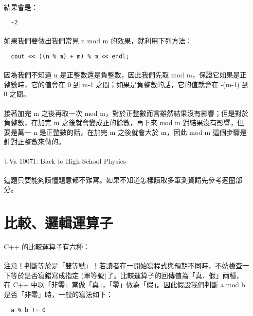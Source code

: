 \documentclass[12pt,a4paper,oneside]{report}
\begin{document}
\begin{CJK}{UTF8}{bkai}
\paragraph{}結果會是：
\begin{lstlisting}
  -2
\end{lstlisting}
\paragraph{}如果我們要做出我們常見 n mod m 的效果，就利用下列方法：
\begin{lstlisting}
  cout << ((n % m) + m) % m << endl;
\end{lstlisting}
\paragraph{}因為我們不知道 n 是正整數還是負整數，因此我們先取 mod m，保證它如果是正整數時，它的值會在 0 到 m-1 之間；如果是負整數的話，它的值就會在 -(m-1) 到 0 之間。
\paragraph{}接著加完 m 之後再取一次 mod m，對於正整數而言雖然結果沒有影響；但是對於負整數，在加完 m 之後就會變成正的餘數，再下來 mod m 對結果沒有影響，但要是萬一 n 是正整數的話，在加完 m 之後就會大於 m，因此 mod m 這個步驟是針對正整數來做的。
\label{UVa:10071}
\paragraph{}UVa 10071: Back to High School Physics
\paragraph{}這題只要能夠讀懂題意都不難寫。如果不知道怎樣讀取多筆測資請先參考迴圈部分。

\section{比較、邏輯運算子}

\paragraph{}C++ 的比較運算子有六種：
\paragraph{}注意！判斷等於是「雙等號」！若讀者在一開始寫程式與預期不同時，不妨檢查一下等於是否寫錯寫成指定 (單等號)了。比較運算子的回傳值為「真、假」兩種，在 C++ 中以「非零」當做「真」，「零」做為「假」。因此假設我們判斷 a mod b 是否「非零」時，一般的寫法如下：
\begin{lstlisting}
  a % b != 0
\end{lstlisting}

\end{CJK}
\end{document}
